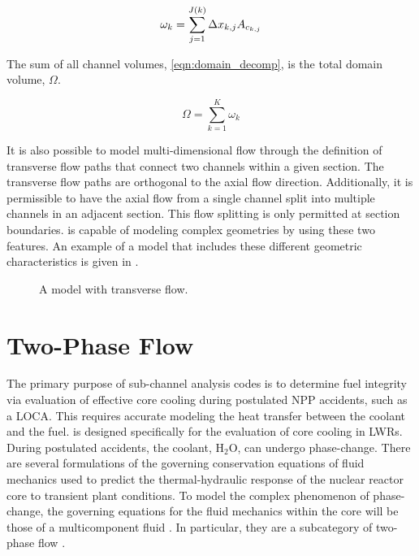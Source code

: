 \begin{equation}
\label{eqn:channel_volume}
\omega_k = \sum_{j = 1}^{J(k)} \dx{}_{k,j} A_{c_{k,j}}
\end{equation}

The sum of all channel volumes, \eqref{eqn:domain_decomp}, is the total domain volume, $\Omega$.

\begin{equation}
\label{eqn:domain_decomp}
\Omega = \sum_{k = 1}^{K} \omega_{k}
\end{equation}

It is also possible to model multi-dimensional flow through the definition of transverse flow paths that connect two channels within a given section.
The transverse flow paths are orthogonal to the axial flow direction.
Additionally, it is permissible to have the axial flow from a single channel split into multiple channels in an adjacent section.
This flow splitting is only permitted at section boundaries.
\cobra{} is capable of modeling complex geometries by using these two features.
An example of a \cobra{} model that includes these different geometric characteristics is given in .

\begin{figure}[ht!]
\centering

\caption{A \cobra{} model with transverse flow.}
\label{fig:complex_geometry}
\end{figure}

\section{Two-Phase Flow}
\label{sect:two_phase_flow}
The primary purpose of sub-channel analysis codes is to determine fuel integrity via evaluation of effective core cooling during postulated NPP accidents, such as a LOCA.
This requires accurate modeling the heat transfer between the coolant and the fuel. 
\cobra{} is designed specifically for the evaluation of core cooling in LWRs.
During postulated accidents, the coolant, H$_2$O, can undergo phase-change.
There are several formulations of the governing conservation equations of fluid mechanics used to predict the thermal-hydraulic response of the nuclear reactor core to transient plant conditions.
To model the complex phenomenon of phase-change, the governing equations for the fluid mechanics within the core will be those of a multicomponent fluid \cite{Drew1998}.
In particular, they are a subcategory of two-phase flow \cite{Todreas2011, Stewart1984, Ishii1984}.

